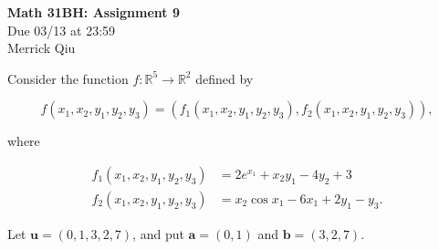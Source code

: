 \documentclass{report}
\begin{document}
\begin{center}
	\huge{\bf Math 31BH: Assignment 9} \\
	Due 03/13 at 23:59 \\ 
	Merrick Qiu
\end{center}

\bigskip

Consider the function $f \colon \mathbb{R}^5 \to \mathbb{R}^2$ defined by 

	$$f(x_1,x_2,y_1,y_2,y_3)= (f_1(x_1,x_2,y_1,y_2,y_3),f_2(x_1,x_2,y_1,y_2,y_3)),$$
	
\noindent
where 
	
	\begin{align*}
		f_1(x_1,x_2,y_1,y_2,y_3) &= 2e^{x_1}+x_2y_1-4y_2+3 \\
		f_2(x_1,x_2,y_1,y_2,y_3) &= x_2 \cos x_1 - 6x_1 + 2y_1 - y_3.
	\end{align*}
	
\noindent
Let $\mathbf{u}=(0,1,3,2,7)$, and put $\mathbf{a}=(0,1)$ and $\mathbf{b}=(3,2,7).$
	
\end{document}

